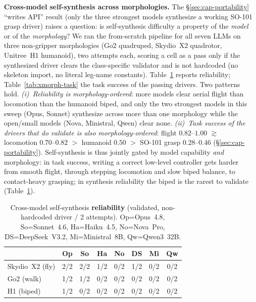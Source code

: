 \noindent\textbf{Cross-model self-synthesis across morphologies.} The
\S\ref{sec:cap-portability} ``writes API'' result (only the three strongest
models synthesize a working SO-101 grasp driver) raises a question: is
self-synthesis difficulty a property of the \emph{model} or of the
\emph{morphology}? We ran the from-scratch pipeline for all seven LLMs on three
non-gripper morphologies (Go2 quadruped, Skydio~X2 quadrotor, Unitree~H1
humanoid), two attempts each, scoring a cell as a pass only if the synthesized
driver clears the class-specific validator and is not hardcoded (no skeleton
import, no literal leg-name constants). Table~\ref{tab:xmorph-synth} reports
reliability; Table~\ref{tab:xmorph-task} the task success of the passing
drivers. Two patterns hold. \emph{(i)~Reliability is morphology-ordered}: more
models clear aerial flight than locomotion than the humanoid biped, and only
the two strongest models in this sweep (Opus, Sonnet) synthesize
across more than one morphology while the open/small models (Nova, Ministral, Qwen) clear none.
\emph{(ii)~Task success of the drivers that do validate is also
morphology-ordered}: flight $0.82$--$1.00$ $\gtrsim$ locomotion $0.70$--$0.82$ $>$
humanoid $0.50$ $>$ SO-101 grasp $0.28$--$0.46$ (\S\ref{sec:cap-portability}).
Self-synthesis is thus jointly gated by model capability \emph{and}
morphology: in task success, writing a correct low-level controller
gets harder from smooth flight, through
stepping locomotion and slow biped balance, to
contact-heavy grasping; in synthesis reliability the biped is the
rarest to validate (Table~\ref{tab:xmorph-synth}).

\begin{table}[H]
\centering\small
\setlength{\tabcolsep}{3.5pt}
\begin{tabular}{lccccccc}
\toprule
 & \textbf{Op} & \textbf{So} & \textbf{Ha} & \textbf{No} & \textbf{DS} & \textbf{Mi} & \textbf{Qw} \\
\midrule
Skydio~X2 (fly)  & 2/2 & 2/2 & 1/2 & 0/2 & 1/2 & 0/2 & 0/2 \\
Go2 (walk)       & 1/2 & 1/2 & 0/2 & 0/2 & 0/2 & 0/2 & 0/2 \\
H1 (biped)       & 1/2 & 0/2 & 0/2 & 0/2 & 0/2 & 0/2 & 0/2 \\
\bottomrule
\end{tabular}
\caption{Cross-model self-synthesis \textbf{reliability} (validated,
non-hardcoded driver / 2 attempts). Op=Opus~4.8, So=Sonnet~4.6, Ha=Haiku~4.5,
No=Nova~Pro, DS=DeepSeek~V3.2, Mi=Ministral~8B, Qw=Qwen3~32B.}
\label{tab:xmorph-synth}
\end{table}

